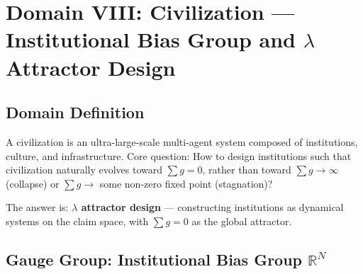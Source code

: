 \documentclass[12pt,a4paper]{article}
\theoremstyle{plain}
\theoremstyle{definition}
\newcommand{\R}{\mathbb{R}}
\begin{document}
\section{Domain VIII: Civilization — Institutional Bias Group and $\lambda$ Attractor Design}

\subsection{Domain Definition}

A civilization is an ultra-large-scale multi-agent system composed of institutions, culture, and infrastructure.
Core question: How to design institutions such that civilization naturally evolves toward $\sum g = 0$,
rather than toward $\sum g \to \infty$ (collapse) or $\sum g \to$ some non-zero fixed point
(stagnation)?

The answer is: \textbf{$\lambda$ attractor design} — constructing institutions as dynamical systems
on the claim space, with $\sum g = 0$ as the global attractor.

\subsection{Gauge Group: Institutional Bias Group $\R^N$}
\end{document}
